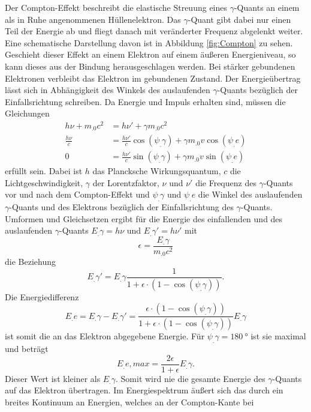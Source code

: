 Der Compton-Effekt beschreibt die elastische Streuung eines $\gamma$-Quants an einem als in Ruhe angenommenen Hüllenelektron. Das $\gamma$-Quant gibt dabei nur einen Teil der Energie ab und fliegt danach mit veränderter Frequenz abgelenkt weiter. Eine schematische Darstellung davon ist in Abbildung \ref{fig:Compton} zu sehen.
Geschieht dieser Effekt an einem Elektron auf einem äußeren Energieniveau, so kann dieses aus der Bindung herausgeschlagen werden. Bei stärker gebundenen Elektronen verbleibt das Elektron im gebundenen Zustand.
Der Energieübertrag lässt sich in Abhängigkeit des Winkels des auslaufenden $\gamma$-Quants bezüglich der Einfallsrichtung schreiben.
Da Energie und Impuls erhalten sind, müssen die Gleichungen
\begin{align*}
h \nu + m_.0 c^2 &= h \nu '+ \gamma m_.0 c^2\\
\frac{h \nu}{c}&= \frac{h \nu '}{c}\cos(\psi_.{\gamma})+\gamma m_.0 v\cos(\psi_.e)\\
0&= \frac{h\nu '}{c}\sin(\psi_.{\gamma})+\gamma m_.0 v\sin(\psi_.e)
\end{align*}
erfüllt sein. Dabei ist $h$ das Plancksche Wirkungsquantum, $c$ die Lichtgeschwindigkeit, $\gamma$ der Lorentzfaktor, $\nu$ und $\nu '$ die Frequenz des $\gamma$-Quants vor und nach dem Compton-Effekt und $\psi_.{\gamma}$ und $\psi_.e$ die Winkel des auslaufenden $\gamma$-Quants und des Elektrons bezüglich der Einfallsrichtung des $\gamma$-Quants.
Umformen und Gleichsetzen ergibt für die Energie des einfallenden und des auslaufenden $\gamma$-Quants $E_.{\gamma}=h\nu$ und $E_.{\gamma}'=h\nu '$ mit \[\epsilon=\frac{E_.{\gamma}}{m_.0c^2}\] die Beziehung
\begin{equation}
E_.{\gamma}'= E_.{\gamma}\frac{1}{1+\epsilon\cdot\left(1-\cos(\psi_.{\gamma})\right)}\text{.}
\end{equation}
Die Energiedifferenz
\begin{equation}
E_.e=E_.{\gamma}-E_.{\gamma}' =\frac{\epsilon\cdot\left(1-\cos(\psi_.{\gamma})\right)}{1+\epsilon\cdot\left(1-\cos(\psi_.{\gamma})\right)}E_.{\gamma}
\end{equation}
ist somit die an das Elektron abgegebene Energie.
Für $\psi_.{\gamma}=\SI{180}{\degree}$ ist sie maximal und beträgt
\begin{equation}
E_.{e,max}=\frac{2\epsilon}{1+\epsilon}E_.{\gamma}\text{.}\label{eq:Emax}
\end{equation}
Dieser Wert ist kleiner als $E_.{\gamma}$. Somit wird nie die gesamte Energie des $\gamma$-Quants auf das Elektron übertragen. Im Energiespektrum äußert sich das durch ein breites Kontinuum an Energien, welches an der Compton-Kante bei
